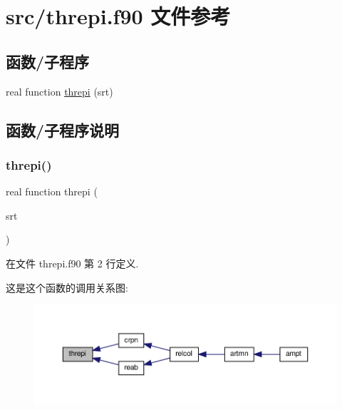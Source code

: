 \hypertarget{threpi_8f90}{}\section{src/threpi.f90 文件参考}
\label{threpi_8f90}
\subsection*{函数/子程序}
\begin{DoxyCompactItemize}
\item 
real function \mbox{\hyperlink{threpi_8f90_a6edc2cc5654fe91cb003fc48c9f112a7}{threpi}} (srt)
\end{DoxyCompactItemize}


\subsection{函数/子程序说明}
\mbox{\label{threpi_8f90_a6edc2cc5654fe91cb003fc48c9f112a7}} 
\subsubsection{\texorpdfstring{threpi()}{threpi()}}
{\footnotesize\ttfamily real function threpi (\begin{DoxyParamCaption}\item[{}]{srt }\end{DoxyParamCaption})}



在文件 threpi.\+f90 第 2 行定义.

这是这个函数的调用关系图\+:
\nopagebreak
\begin{figure}[H]
\begin{center}
\leavevmode
\includegraphics[width=350pt]{threpi_8f90_a6edc2cc5654fe91cb003fc48c9f112a7_icgraph}
\end{center}
\end{figure}
